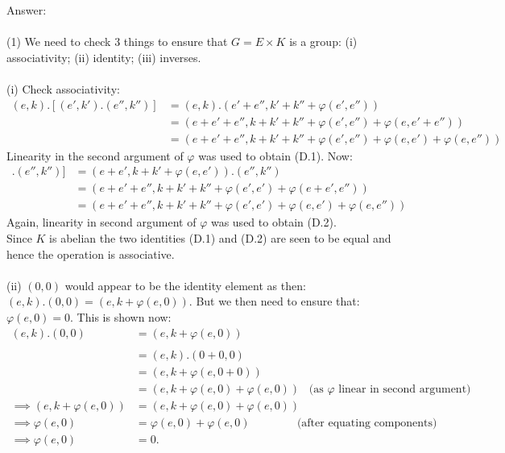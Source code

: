 \documentclass[12pt,a4paper]{article}
\begin{document}
\vspace{1cm}
\noindent
Answer:\\
\\
(1) We need to check 3 things to ensure that $G=E \times K$ is a group: (i) associativity; (ii) identity; (iii) inverses.\\
\\
(i) Check associativity:
\begin{align*}
  (e,k).[(e',k').(e'', k'')] &= (e,k).(e'+e'', k'+k''+ \varphi(e',e'')) \\
  &= (e+e'+e'', k+k'+k'' + \varphi(e',e'') + \varphi(e,e'+e'')) \\
  &= (e+e'+e'', k+k'+k'' + \varphi(e',e'') + \varphi(e,e') + \varphi(e,e'')) \tag{D.1}
\end{align*}
Linearity in the second argument of $\varphi$ was used to obtain (D.1).  Now:
\begin{align*}
  [(e,k).(e',k')].(e'', k'')] &= (e+e', k+k' + \varphi(e,e')).(e'', k'') \\
  &= (e+e'+e'', k+k'+k'' + \varphi(e',e') + \varphi(e+e',e'')) \\
  &= (e+e'+e'', k+k'+k'' + \varphi(e',e') + \varphi(e,e') + \varphi(e,e'')) \tag{D.2}
\end{align*}
Again, linearity in second argument of $\varphi$ was used to obtain (D.2).\\
Since $K$ is abelian the two identities (D.1) and (D.2) are seen to be equal and hence the operation is associative.\\
\\
(ii) $(0,0)$ would appear to be the identity element as then: $(e,k).(0,0) = (e,k + \varphi(e,0))$.  But we then need to ensure that: $\varphi(e,0)=0$.  This is shown now:
\begin{align*}
  (e,k).(0, 0) &= (e,k + \varphi(e,0)) \tag{D.3}\\
  \\
  &= (e,k).(0 + 0, 0) \\
  &=(e,k + \varphi(e,0 + 0)) \\
  &=(e,k + \varphi(e,0) + \varphi(e,0)) \;\;\; \text{(as $\varphi$ linear in second argument)} \\
 \implies (e,k + \varphi(e,0)) &= (e,k + \varphi(e,0) + \varphi(e,0)) \\
 \implies \varphi(e,0) &= \varphi(e,0) + \varphi(e,0) \;\;\;\;\;\;\;\;\;\;\;\;\;\;\; \text{(after equating components)}\\
 \implies \varphi(e,0) &= 0. \tag{D.4}
\end{align*}
\end{document}
